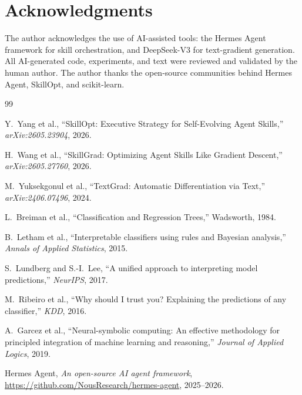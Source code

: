 \documentclass{article}
\begin{document}
\section*{Acknowledgments}

The author acknowledges the use of AI-assisted tools: the Hermes Agent framework for skill orchestration, and DeepSeek-V3 for text-gradient generation. All AI-generated code, experiments, and text were reviewed and validated by the human author. The author thanks the open-source communities behind Hermes Agent, SkillOpt, and scikit-learn.


\begin{thebibliography}{99}

Y.~Yang et al., ``SkillOpt: Executive Strategy for Self-Evolving Agent Skills,''
\textit{arXiv:2605.23904}, 2026.

H.~Wang et al., ``SkillGrad: Optimizing Agent Skills Like Gradient Descent,''
\textit{arXiv:2605.27760}, 2026.

M.~Yuksekgonul et al., ``TextGrad: Automatic Differentiation via Text,''
\textit{arXiv:2406.07496}, 2024.

L.~Breiman et al., ``Classification and Regression Trees,'' Wadsworth, 1984.

B.~Letham et al., ``Interpretable classifiers using rules and Bayesian analysis,''
\textit{Annals of Applied Statistics}, 2015.

S.~Lundberg and S.-I.~Lee, ``A unified approach to interpreting model predictions,''
\textit{NeurIPS}, 2017.

M.~Ribeiro et al., ``Why should I trust you? Explaining the predictions of any classifier,''
\textit{KDD}, 2016.

A.~Garcez et al., ``Neural-symbolic computing: An effective methodology for principled integration of machine learning and reasoning,''
\textit{Journal of Applied Logics}, 2019.

Hermes Agent, \textit{An open-source AI agent framework},
\url{https://github.com/NousResearch/hermes-agent}, 2025--2026.

\end{thebibliography}
\end{document}
